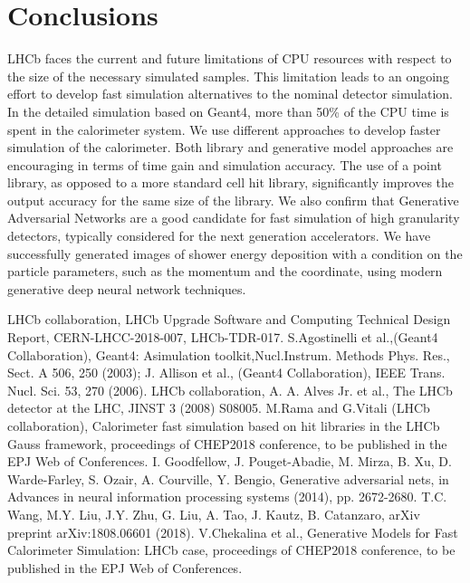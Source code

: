 \documentclass{PoS}
\begin{document}
\section {Conclusions}
LHCb faces the current and future limitations of CPU resources with respect to the size of the necessary simulated samples.  This limitation leads to an ongoing effort to develop fast simulation
alternatives to the nominal detector simulation.  In the detailed simulation based on Geant4, more than 50\% of the CPU time is spent in the calorimeter system. We use different approaches to develop faster simulation of the calorimeter.
Both library and generative model approaches are encouraging in terms
of time gain and simulation accuracy.
The use of a point library, as opposed to a more standard cell hit library, significantly improves the output accuracy for the same size of the library.
We also confirm that Generative Adversarial Networks are a good
candidate for fast simulation of high granularity detectors, typically
considered for the next generation accelerators. 
We have successfully generated images of shower energy deposition with
a condition on the particle parameters, such as the momentum and the
coordinate, using modern generative deep neural network techniques.

%

\begin{thebibliography}{99}
LHCb collaboration, LHCb Upgrade Software and
  Computing Technical Design Report, CERN-LHCC-2018-007, LHCb-TDR-017.
S.Agostinelli et al.,(Geant4 Collaboration), Geant4:
  Asimulation toolkit,Nucl.Instrum. Methods Phys. Res., Sect. A 506, 250 (2003); J. Allison et al., (Geant4
  Collaboration), IEEE Trans. Nucl. Sci. 53, 270 (2006).
LHCb collaboration, A. A. Alves Jr. et al., The LHCb detector at the LHC, JINST 3
(2008) S08005.
M.Rama and G.Vitali (LHCb collaboration),
  Calorimeter fast simulation based on hit libraries in the LHCb Gauss
  framework, proceedings of CHEP2018 conference, to be published in the
  EPJ Web of Conferences.
I. Goodfellow, J. Pouget-Abadie, M. Mirza, B. Xu, D. Warde-Farley, S. Ozair,
A. Courville, Y. Bengio, Generative adversarial nets, in Advances in neural information
processing systems (2014), pp. 2672-2680.
T.C. Wang, M.Y. Liu, J.Y. Zhu, G. Liu, A. Tao, J. Kautz, B. Catanzaro, arXiv preprint
arXiv:1808.06601 (2018).
V.Chekalina et al., Generative Models for Fast Calorimeter Simulation: LHCb case, proceedings of CHEP2018 conference, to be published in the
  EPJ Web of Conferences.
\end{thebibliography}
\end{document}
